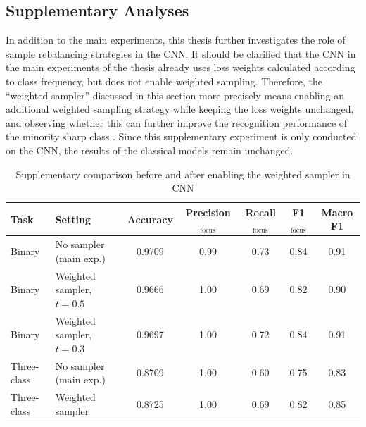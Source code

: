 \subsection{Supplementary Analyses}
\par In addition to the main experiments, this thesis further investigates the
role of sample rebalancing strategies in the CNN. It should be clarified that
the CNN in the main experiments of the thesis already uses loss weights
calculated according to class frequency, but does not enable weighted sampling.
Therefore, the ``weighted sampler'' discussed in this section more precisely
means enabling an additional weighted sampling strategy while keeping the loss
weights unchanged, and observing whether this can further improve the
recognition performance of the minority sharp class
\cite{Cui_2019_CVPR,buda2018systematic}. Since this supplementary experiment is
only conducted on the CNN, the results of the classical models remain unchanged.

\begin{table}[htbp]
    \centering
    \caption{Supplementary comparison before and after enabling the weighted sampler in CNN}
    \label{tab:supp-weighted-sampler}
    \begin{tabular}{llccccc}
        \toprule
        Task & Setting & Accuracy & Precision$_{\mathrm{focus}}$ &
        Recall$_{\mathrm{focus}}$ & F1$_{\mathrm{focus}}$ & Macro F1 \\
        \midrule
        Binary & No sampler (main exp.)     & 0.9709 & 0.99 & 0.73 & 0.84 & 0.91
        \\
        Binary & Weighted sampler, $t=0.5$  & 0.9666 & 1.00 & 0.69 & 0.82 & 0.90
        \\
        Binary & Weighted sampler, $t=0.3$  & 0.9697 & 1.00 & 0.72 & 0.84 & 0.91
        \\
        Three-class & No sampler (main exp.)    & 0.8709 & 1.00 & 0.60 & 0.75 &
        0.83 \\
        Three-class & Weighted sampler          & 0.8725 & 1.00 & 0.69 & 0.82 &
        0.85 \\
        \bottomrule
    \end{tabular}
\end{table}

